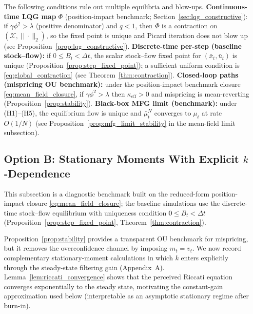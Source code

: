 The following conditions rule out multiple equilibria and blow-ups. \textbf{Continuous-time LQG map} $\Phi$ (position-impact benchmark; Section~\ref{sec:lqg_constructive}): if $\gamma\phi^2>\lambda$ (positive denominator) and $q<1$, then $\Phi$ is a contraction on $(\mathcal X,\|\cdot\|_2)$, so the fixed point is unique and Picard iteration does not blow up (see Proposition~\ref{prop:lqg_constructive}). \textbf{Discrete-time per-step (baseline stock--flow):} if $0\le B_t<\Delta t$, the scalar stock--flow fixed point for $(\bar x_t,\bar u_t)$ is unique (Proposition~\ref{prop:step_fixed_point}); a sufficient uniform condition is \eqref{eq:global_contraction} (see Theorem~\ref{thm:contraction}). \textbf{Closed-loop paths (mispricing OU benchmark):} under the position-impact benchmark closure \eqref{eq:mean_field_closure}, if $\gamma\phi^2>\lambda$ then $\kappa_{\mathrm{eff}}>0$ and mispricing is mean-reverting (Proposition~\ref{prop:stability}). \textbf{Black-box MFG limit (benchmark):} under (H1)--(H5), the equilibrium flow is unique and $\bar\mu^N_t$ converges to $\mu_t$ at rate $O(1/N)$ (see Proposition~\ref{prop:mfg_limit_stability} in the mean-field limit subsection).

\subsection{Option B: Stationary Moments With Explicit \texorpdfstring{$k$}{k}-Dependence}

This subsection is a diagnostic benchmark built on the reduced-form position-impact closure \eqref{eq:mean_field_closure}; the baseline simulations use the discrete-time stock--flow equilibrium with uniqueness condition $0\le B_t<\Delta t$ (Proposition~\ref{prop:step_fixed_point}, Theorem~\ref{thm:contraction}).

Proposition~\ref{prop:stability} provides a transparent OU benchmark for mispricing, but it removes the overconfidence channel by imposing $m_t=v_t$. We now record complementary stationary-moment calculations in which $k$ enters explicitly through the steady-state filtering gain (Appendix~A).
Lemma~\ref{lem:riccati_convergence} shows that the perceived Riccati equation converges exponentially to the steady state, motivating the constant-gain approximation used below (interpretable as an asymptotic stationary regime after burn-in).

